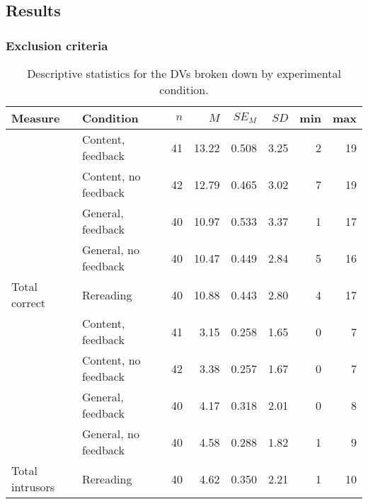 \documentclass[../main.tex]{subfiles}
\begin{document}
\hypertarget{results}{%
\subsection{Results}\label{results}}

\hypertarget{exclusion-criteria}{%
\subsubsection{Exclusion criteria}\label{exclusion-criteria}}

\begin{table*}[t]

\caption{\label{tab:descTable}\label{descTable}Descriptive statistics for the DVs broken down
                     by experimental condition.}
\centering
\begin{tabular}{llrrrrrr}
\toprule
Measure & Condition & $n$ & $M$ & $SE_M$ & $SD$ & min & max\\
\midrule
 & Content, feedback & 41 & 13.22 & 0.508 & 3.25 & 2 & 19\\

 & Content, no feedback & 42 & 12.79 & 0.465 & 3.02 & 7 & 19\\

 & General, feedback & 40 & 10.97 & 0.533 & 3.37 & 1 & 17\\

 & General, no feedback & 40 & 10.47 & 0.449 & 2.84 & 5 & 16\\

\multirow{-5}{*}{\raggedright\arraybackslash Total correct} & Rereading & 40 & 10.88 & 0.443 & 2.80 & 4 & 17\\
\cmidrule{1-8}
 & Content, feedback & 41 & 3.15 & 0.258 & 1.65 & 0 & 7\\

 & Content, no feedback & 42 & 3.38 & 0.257 & 1.67 & 0 & 7\\

 & General, feedback & 40 & 4.17 & 0.318 & 2.01 & 0 & 8\\

 & General, no feedback & 40 & 4.58 & 0.288 & 1.82 & 1 & 9\\

\multirow{-5}{*}{\raggedright\arraybackslash Total intrusors} & Rereading & 40 & 4.62 & 0.350 & 2.21 & 1 & 10\\
\bottomrule
\end{tabular}
\end{table*}
\end{document}

